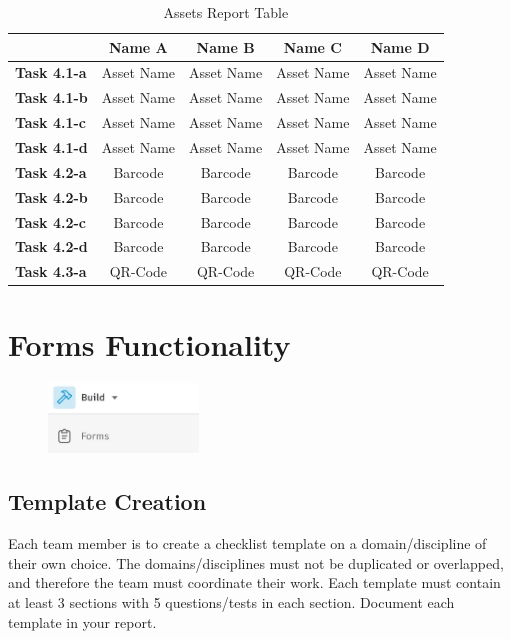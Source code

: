 \begin{table}[ht]
	\centering
	\begin{tabular}{|l|c|c|c|c|}
		\hline
		& \textbf{Name A} & \textbf{Name B} & \textbf{Name C} & \textbf{Name D} \\
		\hline
		\textbf{Task 4.1-a} & Asset Name & Asset Name & Asset Name & Asset Name\\
		\textbf{Task 4.1-b} & Asset Name & Asset Name & Asset Name & Asset Name\\
		\textbf{Task 4.1-c} & Asset Name & Asset Name & Asset Name & Asset Name\\
		\textbf{Task 4.1-d} & Asset Name & Asset Name & Asset Name & Asset Name\\
		\hline
		\textbf{Task 4.2-a} & Barcode & Barcode & Barcode & Barcode\\
		\textbf{Task 4.2-b} & Barcode & Barcode & Barcode & Barcode\\
		\textbf{Task 4.2-c} & Barcode & Barcode & Barcode & Barcode\\
		\textbf{Task 4.2-d} & Barcode & Barcode & Barcode & Barcode\\
		\hline	
		\textbf{Task 4.3-a} & QR-Code & QR-Code & QR-Code & QR-Code\\
		\hline
	\end{tabular}
	\caption{Assets Report Table }
	\label{tab:asset-items}
\end{table}


\newpage
\section{Forms Functionality}

\begin{figure}[h!t]
	\includegraphics[width=4.0cm]{RevitAssets/forms}
	\label{fig:dieldmgmt}
\end{figure}



\subsection{Template Creation}

Each team member is to create a checklist template on a domain/discipline of their own choice.  The domains/disciplines must not be duplicated or overlapped, and therefore the team must coordinate their work.  Each template must contain at least 3 sections with 5 questions/tests in each section.  Document each template in your report.

